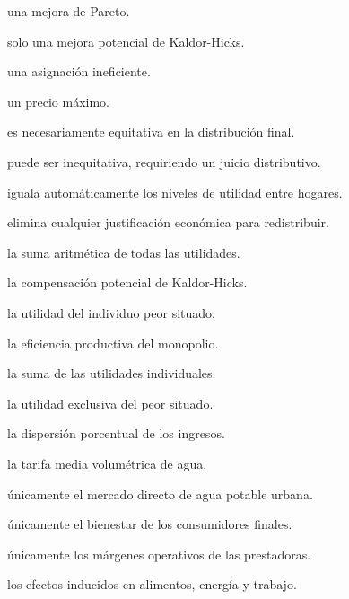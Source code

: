 \begin{opts}
    \item una mejora de Pareto.
    \item solo una mejora potencial de Kaldor-Hicks.
    \item una asignación ineficiente.
    \item un precio máximo.
\end{opts}

\begin{opts}
    \item es necesariamente equitativa en la distribución final.
    \item puede ser inequitativa, requiriendo un juicio distributivo.
    \item iguala automáticamente los niveles de utilidad entre hogares.
    \item elimina cualquier justificación económica para redistribuir.
\end{opts}

\begin{opts}
    \item la suma aritmética de todas las utilidades.
    \item la compensación potencial de Kaldor-Hicks.
    \item la utilidad del individuo peor situado.
    \item la eficiencia productiva del monopolio.
\end{opts}

\begin{opts}
    \item la suma de las utilidades individuales.
    \item la utilidad exclusiva del peor situado.
    \item la dispersión porcentual de los ingresos.
    \item la tarifa media volumétrica de agua.
\end{opts}

\begin{opts}
    \item únicamente el mercado directo de agua potable urbana.
    \item únicamente el bienestar de los consumidores finales.
    \item únicamente los márgenes operativos de las prestadoras.
    \item los efectos inducidos en alimentos, energía y trabajo.
\end{opts}

